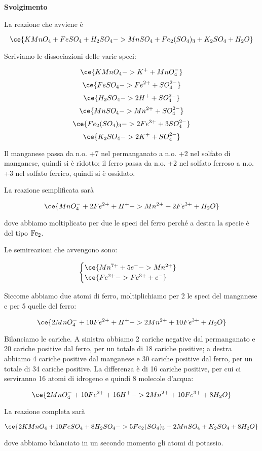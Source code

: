 \large\textbf{Svolgimento}\normalsize

\vspace{0.2cm}La reazione che avviene è

$$\ce{KMnO_4 + FeSO_4 + H_2SO_4 -> MnSO_4 + Fe_2(SO_4)_3 + K_2SO_4 + H_2O}$$

Scriviamo le dissociazioni delle varie speci:

$$\ce{KMnO_4 -> K^+ + MnO_4^-}$$
$$\ce{FeSO_4 -> Fe^{2+} + SO_4^{2-}}$$
$$\ce{H_2SO_4 -> 2H^+ + SO_4^{2-}}$$
$$\ce{MnSO_4 -> Mn^{2+} + SO_4^{2-}}$$
$$\ce{Fe_2(SO_4)_3 -> 2Fe^{3+} + 3SO_4^{2-}}$$
$$\ce{K_2SO_4 -> 2K^+ + SO_4^{2-}}$$

Il manganese passa da n.o. +7 nel permanganato a n.o. +2 nel solfato di manganese, quindi si è ridotto; il ferro passa da n.o. +2 nel solfato ferroso a n.o. +3 nel solfato ferrico, quindi si è ossidato.

La reazione semplificata sarà

$$\ce{MnO_4^- + 2Fe^{2+} + H^+ -> Mn^{2+} + 2Fe^{3+} + H_2O}$$

dove abbiamo moltiplicato per due le speci del ferro perché a destra la specie è del tipo $\rm Fe_2$.

Le semireazioni che avvengono sono:

$$\begin{cases}
    \ce{Mn^{7+} + 5e^- -> Mn^{2+}}\\
    \ce{Fe^{2+} -> Fe^{3+} + e^-}
\end{cases}$$

Siccome abbiamo due atomi di ferro, moltiplichiamo per 2 le speci del manganese e per 5 quelle del ferro:

$$\ce{2MnO_4^- + 10Fe^{2+} + H^+ -> 2Mn^{2+} + 10Fe^{3+} + H_2O}$$

Bilanciamo le cariche. A sinistra abbiamo 2 cariche negative dal permanganato e 20 cariche positive dal ferro, per un totale di 18 cariche positive; a destra abbiamo 4 cariche positive dal manganese e 30 cariche positive dal ferro, per un totale di 34 cariche positive. La differenza è di 16 cariche positive, per cui ci serviranno 16 atomi di idrogeno e quindi 8 molecole d'acqua:

$$\ce{2MnO_4^- + 10Fe^{2+} + 16H^+ -> 2Mn^{2+} + 10Fe^{3+} + 8H_2O}$$

La reazione completa sarà

$$\ce{2KMnO_4 + 10FeSO_4 + 8H_2SO_4 -> 5Fe_2(SO_4)_3 + 2MnSO_4 + K_2SO_4 + 8H_2O}$$

dove abbiamo bilanciato in un secondo momento gli atomi di potassio.

